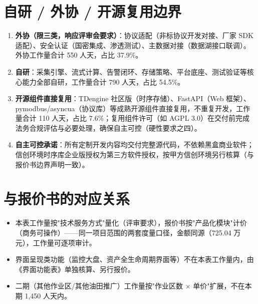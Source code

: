 \documentclass[11pt,a4paper]{ctexart}
\begin{document}
\section{自研 / 外协 / 开源复用边界}

\begin{enumerate}[leftmargin=*]
  \item \textbf{外协（限三类，响应评审会要求）}：协议适配（非标协议开发对接、厂家 SDK 适配）、安全认证（国密集成、渗透测试）、主数据对接（数据湖接口联调）。外协工作量合计 550 人天，占比 37.9\%。
  \item \textbf{自研}：采集引擎、流式计算、告警闭环、存储策略、平台底座、测试验证等核心能力全部自研，工作量合计 790 人天，占比 54.5\%。
  \item \textbf{开源组件直接复用}：TDengine 社区版（时序存储）、FastAPI（Web 框架）、pymodbus/asyncua（协议库）等成熟开源组件直接复用，不重复开发，工作量合计 110 人天，占比 7.6\%；复用组件许可（如 AGPL 3.0）在交付前完成法务合规评估与必要处理，确保自主可控（硬性要求之四）。
  \item \textbf{自主可控承诺}：所有定制开发内容均交付完整源代码，不依赖黑盒商业软件；信创环境时序库企业版授权为第三方软件授权，按甲方信创环境另行核算（与报价书边界声明一致）。
\end{enumerate}

\section{与报价书的对应关系}

\begin{itemize}[leftmargin=*]
  \item 本表工作量按"技术服务方式"量化（评审要求），报价书按"产品化模块"计价（商务可操作）——同一项目范围的两套度量口径，金额同源（725.04 万元），工作量可逐项审计。
  \item 界面呈现类功能（监控大盘、资产全生命周期界面等）不在本表工作量内，由《界面功能表》单独核算、另行报价。
  \item 二期（其他作业区/其他油田推广）工作量按"作业区数 $\times$ 单价"扩展，不在本期 1,450 人天内。
\end{itemize}
\end{document}
